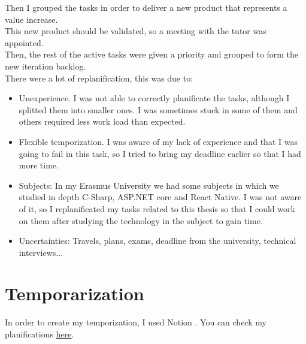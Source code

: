 Then I grouped the tasks in order to deliver a new product that represents a value increase. \\
This new product should be validated, so a meeting with the tutor was appointed. \\
Then, the rest of the active tasks were given a priority and grouped to form the new iteration backlog. \\
There were a lot of replanification, this was due to:
\begin{itemize}
    \item Unexperience. I was not able to correctly planificate the tasks, although I splitted them into smaller ones. I was sometimes stuck in some of them and others required less work load than expected.
    \item Flexible temporization. I was aware of my lack of experience and that I was going to fail in this task, so I tried to bring my deadline earlier so that I had more time.
    \item Subjects: In my Erasmus University we had some subjects in which we studied in depth C-Sharp, ASP.NET core and React Native. I was not aware of it, so I replanificated my tasks related to this thesis so that I could work on them after studying the technology in the subject to gain time.
    \item Uncertainties: Travels, plans, exams, deadline from the university, technical interviews...
\end{itemize}

\section{Temporarization}
In order to create my temporization, I used Notion \cite{Notion}. You can check my planifications \href{https://cyclic-chiller-238.notion.site/LearnASL-60bb8f91ed8f4ccfa90f98ee2306403d}{here}. \\

